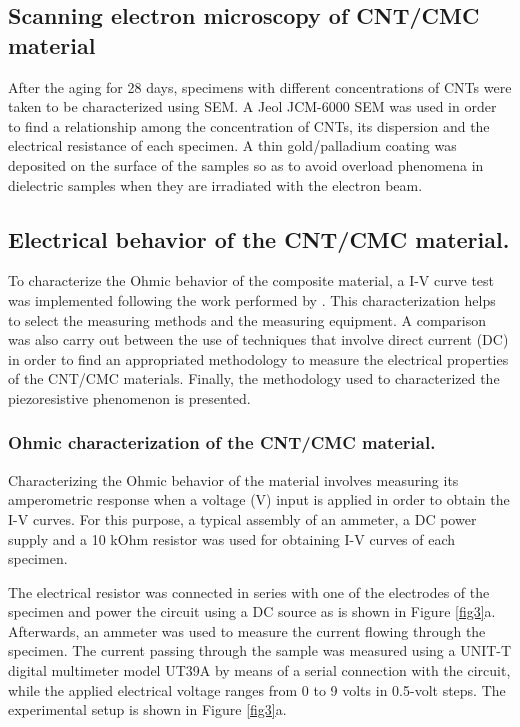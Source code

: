 \documentclass[twocolumn]{bmcart}%
\begin{document}
\subsection{Scanning electron microscopy of CNT/CMC material}
After the aging for 28 days, specimens with different concentrations of CNTs were taken to be characterized using SEM. A Jeol JCM-6000 SEM was used in order to find a relationship among the concentration of CNTs, its dispersion and the electrical resistance of each specimen. A thin gold/palladium coating was deposited on the surface of the samples so as to avoid overload phenomena in dielectric samples when they are irradiated with the electron beam.

\subsection{Electrical behavior of the CNT/CMC material.}

To characterize the Ohmic behavior of the composite material, a I-V curve test  was implemented following the work performed by \cite{Han2015a}. This characterization helps to select the measuring methods and the measuring equipment. A comparison was also carry out between the use of techniques that involve direct current (DC) in order to find an appropriated methodology to measure the electrical properties of the CNT/CMC materials. Finally, the methodology used to characterized the piezoresistive phenomenon is presented.

\subsubsection{Ohmic characterization of the CNT/CMC material.}

Characterizing the Ohmic behavior of the material involves measuring its  amperometric response when a voltage (V) input is applied in order to obtain the I-V curves. For this purpose, a typical assembly \cite{YORKE1981200} of an ammeter, a DC power supply and a 10 kOhm resistor was used for obtaining I-V curves of each specimen.

The electrical resistor was connected in series with one of the electrodes of the specimen and power the circuit using a DC source  as is shown in Figure \ref{fig3}a. Afterwards, an ammeter was used to measure the current flowing through the specimen. The current passing through the sample was measured using a UNIT-T digital multimeter model UT39A by means of a serial connection with the circuit, while the applied electrical voltage ranges from 0 to 9 volts in 0.5-volt steps. The experimental setup is shown in Figure \ref{fig3}a.
\end{document}
